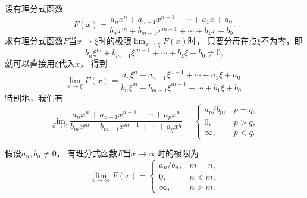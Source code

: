\begin{example}
设有理分式函数\begin{equation*}
	F(x)
	= \frac{a_n x^n + a_{n-1} x^{n-1} + \dotsb + a_1 x + a_0}
	{b_n x^m + b_{m-1} x^{m-1} + \dotsb + b_1 x + b_0}.
\end{equation*}
求有理分式函数\(F\)当\(x\to\xi\)时的极限\(\lim_{x\to\xi} F(x)\)时，
只要分母在点\(\xi\)不为零，即\begin{equation*}
	b_n \xi^m + b_{m-1} \xi^{m-1} + \dotsb + b_1 \xi + b_0 \neq 0,
\end{equation*}
就可以直接用\(\xi\)代入\(x\)，
得到\begin{equation}\label{equation:函数极限.重要极限4}
	\lim_{x\to\xi} F(x)
	= \frac{a_n \xi^n + a_{n-1} \xi^{n-1} + \dotsb + a_1 \xi + a_0}
	{b_n \xi^m + b_{m-1} \xi^{m-1} + \dotsb + b_1 \xi + b_0}.
\end{equation}
特别地，我们有\begin{equation}\label{equation:函数极限.重要极限5}
	\lim_{x\to0} \frac{a_n x^n + a_{n-1} x^{n-1} + \dotsb + a_p x^p}
	{b_m x^m + b_{m-1} x^{m-1} + \dotsb + a_q x^q}
	= \left\{ \begin{array}{cl}
		a_p/b_p, & p=q, \\
		0, & p>q, \\
		\infty, & p<q.
	\end{array} \right.
\end{equation}

假设\(a_n,b_n\neq0\)，
有理分式函数\(F\)当\(x\to\infty\)时的极限为\begin{equation}\label{equation:函数极限.重要极限6}
	\lim_{x\to\infty} F(x)
	= \left\{ \begin{array}{cl}
		a_n/b_n, & m=n, \\
		0, & n<m, \\
		\infty, & n>m.
	\end{array} \right.
\end{equation}
\end{example}


